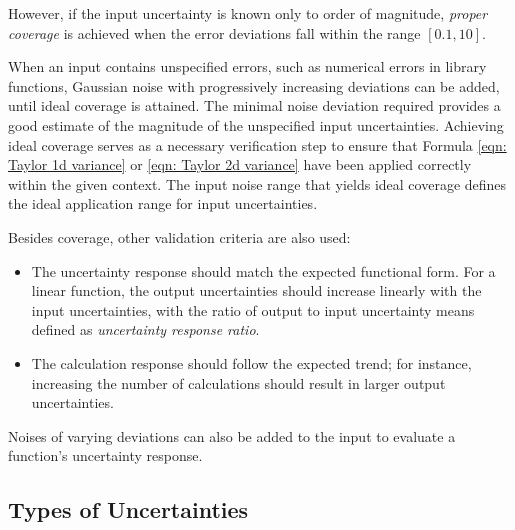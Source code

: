 \documentclass[twoside]{article}
\numberwithin{equation}{section}
\begin{document}
However, if the input uncertainty is known only to order of magnitude, \emph{proper coverage} is achieved when the error deviations fall within the range $[0.1, 10]$.

When an input contains unspecified errors, such as numerical errors in library functions, Gaussian noise with progressively increasing deviations can be added, until ideal coverage is attained.
The minimal noise deviation required provides a good estimate of the magnitude of the unspecified input uncertainties.
Achieving ideal coverage serves as a necessary verification step to ensure that Formula \eqref{eqn: Taylor 1d variance} or \eqref{eqn: Taylor 2d variance} have been applied correctly within the given context.
The input noise range that yields ideal coverage defines the ideal application range for input uncertainties.

Besides coverage, other validation criteria are also used:
\begin{itemize}
\item The uncertainty response should match the expected functional form.
For a linear function, the output uncertainties should increase linearly with the input uncertainties, with the ratio of output to input uncertainty means defined as \emph{uncertainty response ratio}.

\item The calculation response should follow the expected trend; for instance, increasing the number of calculations should result in larger output uncertainties.

\end{itemize}
Noises of varying deviations can also be added to the input to evaluate a function’s uncertainty response.



\subsection{Types of Uncertainties}
\end{document}
